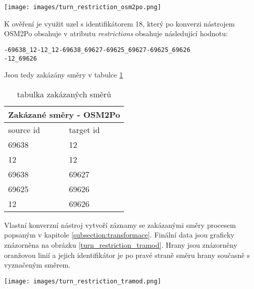\begin{sidewaysfigure}[htbp]
\texttt{[image: images/turn\_restriction\_osm2po.png]}
\caption{Data po konverzi vlastním nástrojem}
\label{turn_restriction_osm2po}
\end{sidewaysfigure}

K ověření je využit uzel s identifikátorem 18, který po konverzi nástrojem OSM2Po obsahuje v atributu \textit{restrictions} obsahuje následující hodnotu:

\begin{lstlisting}
-69638_12-12_12-69638_69627-69625_69627-69625_69626
-12_69626
\end{lstlisting}

Jsou tedy zakázány směry v tabulce \ref{table:zakazane_smery_osm2po}

\begin{table}[htbp]
\centering
\begin{tabular}{|ll|}
\hline
\multicolumn{2}{|l|}{Zakázané směry - OSM2Po}        \\ \hline
\multicolumn{1}{|l|}{source id} & target id \\ \hline
\multicolumn{1}{|l|}{69638}         & 12         \\ \hline
\multicolumn{1}{|l|}{12}         & 12         \\ \hline
\multicolumn{1}{|l|}{69638}         & 69627         \\ \hline
\multicolumn{1}{|l|}{69625}         & 69626         \\ \hline
\multicolumn{1}{|l|}{12}         & 69626         \\ \hline
\end{tabular}
\caption{tabulka zakázaných směrů}
\label{table:zakazane_smery_osm2po}
\end{table}

Vlastní konverzní nástroj vytvoří záznamy se zakázanými směry procesem popsaným v kapitole \ref{subsection:transformace}. Finální data jsou graficky znázorněna na obrázku \ref{turn_restriction_tramod}. Hrany jsou znázorněny oranžovou linií a jejich identifikátor je po pravé straně směru hrany současně s vyznačeným směrem. 

\begin{sidewaysfigure}[htbp]
\texttt{[image: images/turn\_restriction\_tramod.png]}
\caption{Data po konverzi vlastním nástrojem}
\label{turn_restriction_tramod}
\end{sidewaysfigure}




